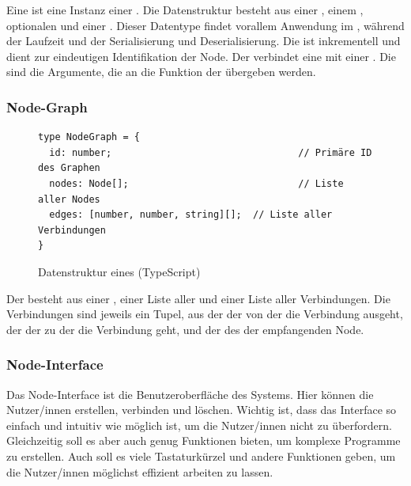 \documentclass[ngerman]{article}
\begin{document}
Eine  ist eine Instanz einer . Die Datenstruktur besteht aus einer , einem , optionalen  und einer . 
Dieser Datentype findet vorallem Anwendung im , während der Laufzeit und der Serialisierung und Deserialisierung.
\br
Die  ist inkrementell und dient zur eindeutigen Identifikation der Node. Der  verbindet eine  mit einer .
Die  sind die Argumente, die an die  Funktion der  übergeben werden.

\subsubsection*{Node-Graph}

\begin{figure}[htbp]
  \begin{code}
    \begin{verbatim}
type NodeGraph = {
  id: number;                                 // Primäre ID des Graphen
  nodes: Node[];                              // Liste aller Nodes
  edges: [number, number, string][];  // Liste aller Verbindungen
}
    \end{verbatim}
  \end{code}

  \caption{Datenstruktur eines  (TypeScript)}
  \label{fig:data_node_graph}

\end{figure}

Der  besteht aus einer , einer Liste aller  und einer Liste aller Verbindungen. 
Die Verbindungen sind jeweils ein Tupel, aus der  der  von der die Verbindung ausgeht, der  der  zu der die Verbindung geht, und der  des  der empfangenden Node.

\pagebreak

\subsubsection{Node-Interface}
\label{sec:node_interface}

Das Node-Interface ist die Benutzeroberfläche des Systems. Hier können die Nutzer/innen  erstellen, verbinden und löschen. 
Wichtig ist, dass das Interface so einfach und intuitiv wie möglich ist, um die Nutzer/innen nicht zu überfordern. Gleichzeitig soll es aber auch genug Funktionen bieten, um komplexe Programme zu erstellen. Auch soll es viele Tastaturkürzel und andere Funktionen geben, um die Nutzer/innen möglichst effizient arbeiten zu lassen.
\end{document}
